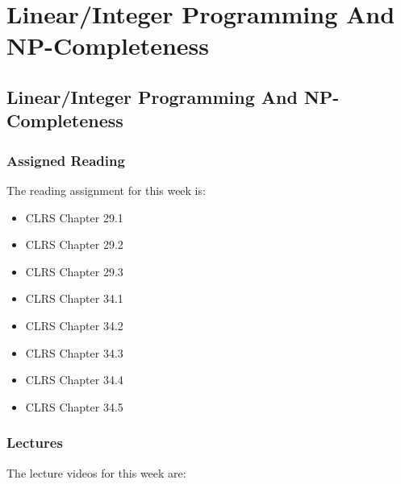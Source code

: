 \clearpage

\renewcommand{\ChapTitle}{Linear/Integer Programming And NP-Completeness}
\renewcommand{\SectionTitle}{Linear/Integer Programming And NP-Completeness}

\chapter{\ChapTitle}
\section{\SectionTitle}

\subsection{Assigned Reading}

The reading assignment for this week is:

\begin{itemize}
    \item CLRS Chapter 29.1
    \item CLRS Chapter 29.2
    \item CLRS Chapter 29.3
    \item CLRS Chapter 34.1
    \item CLRS Chapter 34.2
    \item CLRS Chapter 34.3
    \item CLRS Chapter 34.4
    \item CLRS Chapter 34.5
\end{itemize}

\subsection{Lectures}

The lecture videos for this week are:

